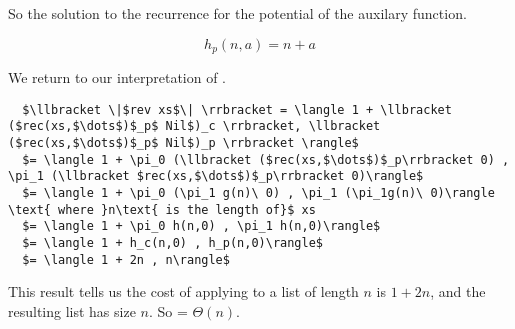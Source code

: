So the solution to the recurrence for the potential of the auxilary function.
\begin{framed}
  \[h_p(n,a) = n + a \]
\end{framed}


We return to our interpretation of .
\begin{lstlisting}
  $\llbracket \|$rev xs$\| \rrbracket = \langle 1 + \llbracket ($rec(xs,$\dots$)$_p$ Nil$)_c \rrbracket, \llbracket ($rec(xs,$\dots$)$_p$ Nil$)_p \rrbracket \rangle$
  $= \langle 1 + \pi_0 (\llbracket ($rec(xs,$\dots$)$_p\rrbracket 0) , \pi_1 (\llbracket $rec(xs,$\dots$)$_p\rrbracket 0)\rangle$
  $= \langle 1 + \pi_0 (\pi_1 g(n)\ 0) , \pi_1 (\pi_1g(n)\ 0)\rangle \text{ where }n\text{ is the length of}$ xs
  $= \langle 1 + \pi_0 h(n,0) , \pi_1 h(n,0)\rangle$
  $= \langle 1 + h_c(n,0) , h_p(n,0)\rangle$
  $= \langle 1 + 2n , n\rangle$
\end{lstlisting}


This result tells us the cost of applying  to a list  of length $n$ is $1+2n$, and the resulting list has size $n$.
So  = $\Theta(n)$.
